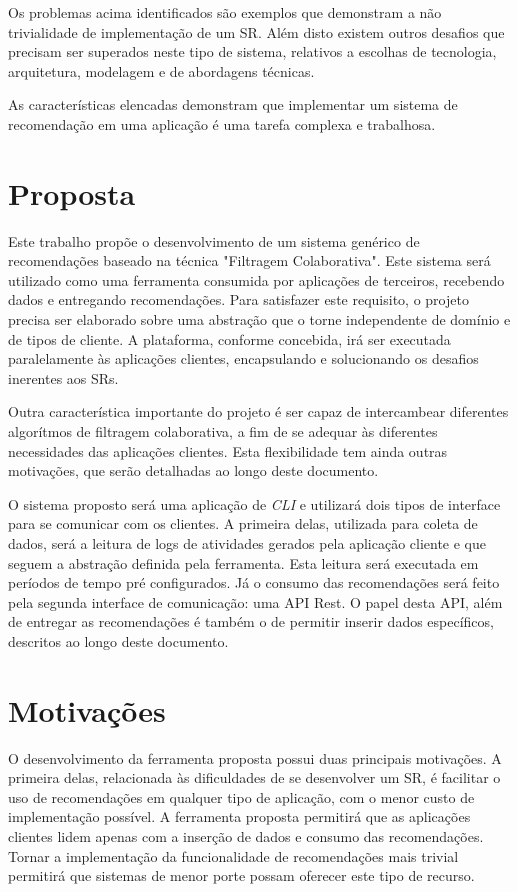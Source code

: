 \documentclass[
	12pt,				%
    oneside,			%
	a4paper,			%
	english,			%
	french,				%
	spanish,			%
	brazil,				%
	]{abntex2}
\begin{document}
Os problemas acima identificados são exemplos que demonstram a não trivialidade de implementação de um SR. Além disto existem outros desafios que precisam ser
superados neste tipo de sistema, relativos a escolhas de tecnologia, arquitetura, modelagem e de abordagens técnicas. 

As características elencadas demonstram que implementar um sistema de recomendação em uma aplicação é uma tarefa complexa e trabalhosa.

\section{Proposta}
Este trabalho propõe o desenvolvimento de um sistema genérico de recomendações baseado na técnica "Filtragem Colaborativa". Este sistema será utilizado como uma ferramenta
consumida por aplicações de terceiros, recebendo dados e entregando recomendações. Para satisfazer este requisito, o projeto precisa ser elaborado sobre
uma abstração que o torne independente de domínio e de tipos de cliente. A plataforma, conforme concebida, irá ser executada paralelamente às aplicações clientes,
encapsulando e solucionando os desafios inerentes aos SRs.

Outra característica importante do projeto é ser capaz de intercambear diferentes algorítmos de filtragem colaborativa, a fim de se adequar às diferentes necessidades
das aplicações clientes. Esta flexibilidade tem ainda outras motivações, que serão detalhadas ao longo deste documento. 

O sistema proposto será uma aplicação de \textit{CLI} e utilizará dois tipos de interface para se comunicar com os clientes. A primeira delas, utilizada para coleta 
de dados, será a leitura de logs de atividades gerados pela aplicação cliente e que seguem a abstração definida pela ferramenta. Esta leitura será executada em períodos 
de tempo pré configurados. Já o consumo das recomendações será feito pela segunda interface de comunicação: uma API Rest. O papel desta API, além de entregar as
recomendações é também o de permitir inserir dados específicos, descritos ao longo deste documento. 

\section{Motivações}
O desenvolvimento da ferramenta proposta possui duas principais motivações. A primeira delas, relacionada às dificuldades de se desenvolver um SR, é facilitar o uso
de recomendações em qualquer tipo de aplicação, com o menor custo de implementação possível. A ferramenta proposta permitirá que as aplicações clientes lidem apenas
com a inserção de dados e consumo das recomendações. Tornar a implementação da funcionalidade de recomendações mais trivial permitirá que sistemas de menor porte
possam oferecer este tipo de recurso.
\end{document}
